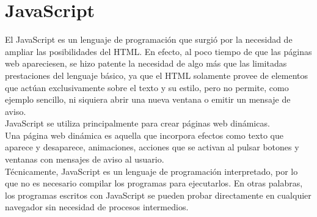 \section{JavaScript}
El JavaScript es un lenguaje de programaci\'on que surgi\'o por la necesidad de ampliar las posibilidades del HTML. En efecto, al poco tiempo de que las p\'aginas web apareciesen, se hizo patente la necesidad de algo m\'as que las limitadas prestaciones del lenguaje b\'asico, ya que el HTML solamente provee de elementos que act\'uan exclusivamente sobre el texto y su estilo, pero no permite, como ejemplo sencillo, ni siquiera abrir una nueva ventana o emitir un mensaje de aviso.\\
JavaScript  se utiliza principalmente para crear p\'aginas web din\'amicas.\\
Una p\'agina web din\'amica es aquella que incorpora efectos como texto que aparece y desaparece, animaciones, acciones que se activan al pulsar botones y ventanas con mensajes de aviso al usuario.\\
T\'ecnicamente, JavaScript es un lenguaje de programaci\'on interpretado, por lo que no es necesario compilar los programas para ejecutarlos. En otras palabras, los programas escritos con JavaScript se pueden probar directamente en cualquier navegador sin necesidad de procesos intermedios. \cite{js}


